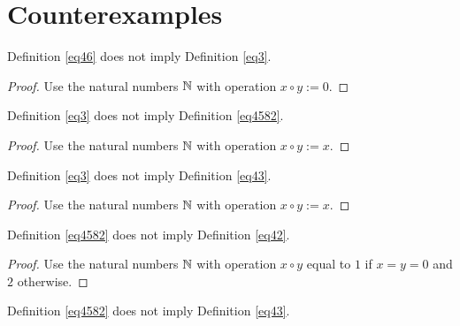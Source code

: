 \chapter{Counterexamples}

\begin{theorem}\label{46_not_imply_3}\leanok{} Definition \ref{eq46} does not imply Definition \ref{eq3}.
\end{theorem}

\begin{proof} Use the natural numbers $\mathbb{N}$ with operation $x \circ y := 0$.
\end{proof}

\begin{theorem}\label{3_not_imply_4582}\leanok{} Definition \ref{eq3} does not imply Definition \ref{eq4582}.
\end{theorem}

\begin{proof} Use the natural numbers $\mathbb{N}$ with operation $x \circ y := x$.
\end{proof}

\begin{theorem}\label{3_not_imply_43}\leanok{} Definition \ref{eq3} does not imply Definition \ref{eq43}.
\end{theorem}

\begin{proof} Use the natural numbers $\mathbb{N}$ with operation $x \circ y := x$.
\end{proof}

\begin{theorem}\label{4582_not_imply_42}\leanok{} Definition \ref{eq4582} does not imply Definition \ref{eq42}.
\end{theorem}

\begin{proof} Use the natural numbers $\mathbb{N}$ with operation
$x \circ y$ equal to $1$ if $x=y=0$ and $2$ otherwise.
\end{proof}

\begin{theorem}\label{4582_not_imply_43}\leanok{} Definition \ref{eq4582} does not imply Definition \ref{eq43}.
\end{theorem}

